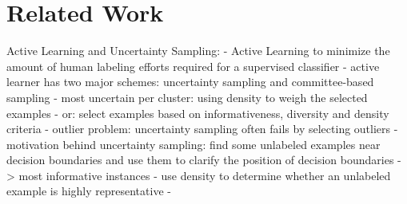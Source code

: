 \chapter{Related Work}
\label{ch:relatedwork}


















Active Learning and Uncertainty Sampling: \cite{5272205}
- Active Learning to minimize the amount of human labeling efforts required for a supervised classifier
- active learner has two major schemes: uncertainty sampling and committee-based sampling
- most uncertain per cluster: using density to weigh the selected examples
- or: select examples based on informativeness, diversity and density criteria
- outlier problem: uncertainty sampling often fails by selecting outliers
- motivation behind uncertainty sampling: find some unlabeled examples near decision boundaries and use them to clarify the position of decision boundaries -> most informative instances
- use density to determine whether an unlabeled example is highly representative
- 











